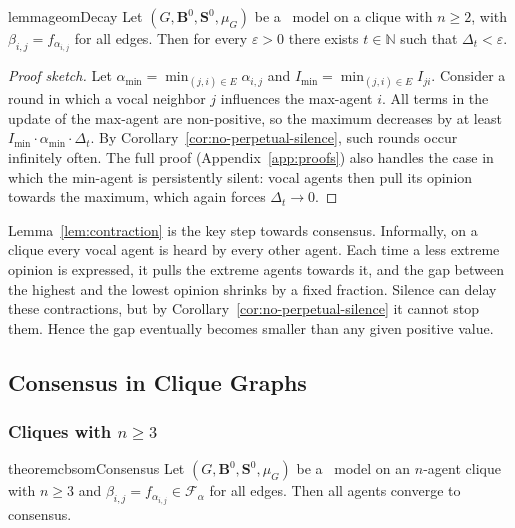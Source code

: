 \begin{restatable}{lemma}{geomDecay}
\label{lem:contraction}
  Let $(G,\mathbf{B}^0,\mathbf{S}^0,\mu_G)$ be a \CBSOMminus\ model
  on a clique with $n\ge 2$, with $\beta_{i,j}=f_{\alpha_{i,j}}$ for
  all edges. Then for every $\varepsilon>0$ there exists $t\in\mathbb{N}$ such
  that $\Delta_t < \varepsilon$.
\end{restatable}

\begin{proof}[Proof sketch]
  Let $\alpha_{\min}=\min_{(j,i)\in E}\alpha_{i,j}$ and
  $I_{\min}=\min_{(j,i)\in E}I_{ji}$.
  Consider a round in which a vocal neighbor $j$ influences the
  max-agent $i$. All terms in the update of the max-agent are
  non-positive, so the maximum decreases by at least
  $I_{\min}\cdot\alpha_{\min}\cdot \Delta_t$.
  By Corollary~\ref{cor:no-perpetual-silence}, such rounds occur
  infinitely often. The full proof (Appendix~\ref{app:proofs})
  also handles the case in which the min-agent is persistently silent:
  vocal agents then pull its opinion towards the maximum, which again
  forces $\Delta_t\to 0$.
\end{proof}

Lemma~\ref{lem:contraction} is the key step towards consensus.
Informally, on a clique every vocal agent is heard by every other agent.
Each time a less extreme opinion is expressed, it pulls the extreme
agents towards it, and the gap between the highest and the lowest opinion
shrinks by a fixed fraction. Silence can delay these contractions, but by
Corollary~\ref{cor:no-perpetual-silence} it cannot stop them. Hence the
gap eventually becomes smaller than any given positive value.

\FloatBarrier
\subsection{Consensus in Clique Graphs}
\label{sec:consensus-cliques}

\subsubsection{Cliques with \texorpdfstring{$n\ge 3$}{n >= 3}}

\begin{restatable}{theorem}{cbsomConsensus}
\label{thm:cbsom-consensus-n3}
  Let $(G,\mathbf{B}^0,\mathbf{S}^0,\mu_G)$ be a \CBSOMminus\ model
  on an $n$-agent clique with $n\ge 3$ and
  $\beta_{i,j}=f_{\alpha_{i,j}}\in\mathcal{F}_\alpha$ for all edges.
  Then all agents converge to consensus.
\end{restatable}

